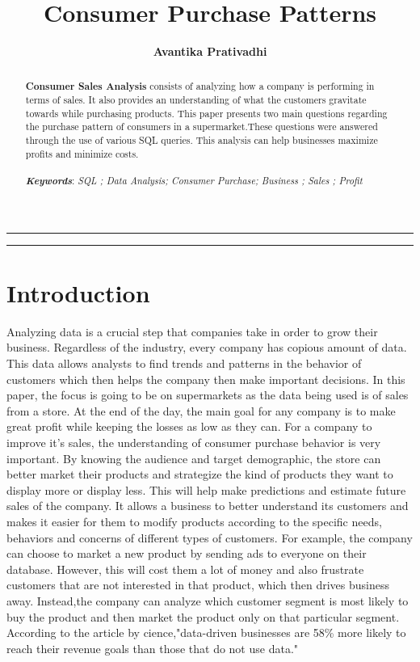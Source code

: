 \documentclass{article}
\author[1]{\textbf{Avantika Prativadhi}}
\title{\textbf{\huge Consumer Purchase Patterns }\\
	}
\date{}
\begin{document}
\pagestyle{headings}	
\newpage
\setcounter{page}{1}
\renewcommand{\thepage}{\arabic{page}}

	
\setlength{\parskip}{0.5em}
	
\maketitle
	
\noindent\rule{15cm}{0.5pt}
	\begin{abstract}

		\textbf{Consumer Sales Analysis }consists of analyzing how a company is performing in terms of sales. It also provides an understanding of what the customers gravitate towards while purchasing products. This paper presents two main questions regarding the purchase pattern of consumers in a supermarket.These questions were answered through the use of various SQL queries. This analysis can help businesses maximize profits and minimize costs.  \\ \\
	
		\textbf{\textit{Keywords}}: \textit{SQL ; Data Analysis; Consumer Purchase; Business ; Sales ; Profit }
	\end{abstract}
\noindent\rule{15cm}{0.4pt}

\section{Introduction}
Analyzing data is a crucial step that companies take in order to grow their business. Regardless of the industry, every company has copious amount of data. This data allows analysts to find trends and patterns in the behavior of customers which then helps the company then make important decisions. In this paper, the focus is going to be on supermarkets as the data being used is of sales from a store. At the end of the day, the main goal for any company is to make great profit while keeping the losses as low as they can. For a company to improve it's sales, the understanding of consumer purchase behavior is very important. By knowing the audience and target demographic, the store can better market their products and strategize the kind of products they want to display more or display less. This will help make predictions and estimate future sales of the company. It allows a business to better understand its customers and makes it easier for them to modify products according to the specific needs, behaviors and concerns of different types of customers. For example, the company can choose to market a new product by sending ads to everyone on their database. However, this will cost them a lot of money and also frustrate customers that are not interested in that product, which then drives business away. Instead,the company can analyze which customer segment is most likely to buy the product and then market the product only on that particular segment. According to the article by \cite{Pagotto}cience,"data-driven businesses are 58\%  more likely to reach their revenue goals than those that do not use data."
\end{document}

